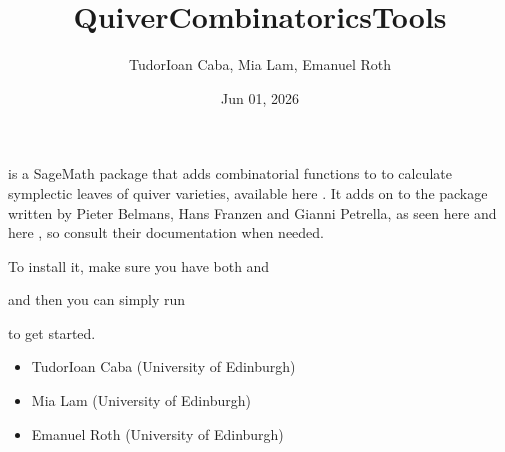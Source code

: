 \documentclass[letterpaper,10pt,english]{sphinxmanual}
\title{QuiverCombinatoricsTools}
\date{Jun 01, 2026}
\author{Tudor\sphinxhyphen{}Ioan Caba, Mia Lam, Emanuel Roth}
\begin{document}
\pagestyle{empty}
\sphinxmaketitle
\pagestyle{plain}
\sphinxtableofcontents
\pagestyle{normal}
\label{\detokenize{index::doc}}


\sphinxAtStartPar
{} is a SageMath package that adds combinatorial functions to  to calculate symplectic leaves of quiver varieties, available here . It adds on to the  package written by Pieter Belmans, Hans Franzen and Gianni Petrella, as seen here  and here , so consult their documentation when needed.

\sphinxAtStartPar
To install it, make sure you have both  and 

\begin{sphinxVerbatim}[commandchars=\\\{\}]
   
   
\end{sphinxVerbatim}

\sphinxAtStartPar
and then you can simply run

\begin{sphinxVerbatim}[commandchars=\\\{\}]
 
 
\end{sphinxVerbatim}

\sphinxAtStartPar
to get started.

\sphinxAtStartPar
{}
\begin{itemize}
\item {} 
\sphinxAtStartPar
Tudor\sphinxhyphen{}Ioan Caba (University of Edinburgh)

\item {} 
\sphinxAtStartPar
Mia Lam (University of Edinburgh)

\item {} 
\sphinxAtStartPar
Emanuel Roth (University of Edinburgh)

\end{itemize}
\end{document}
